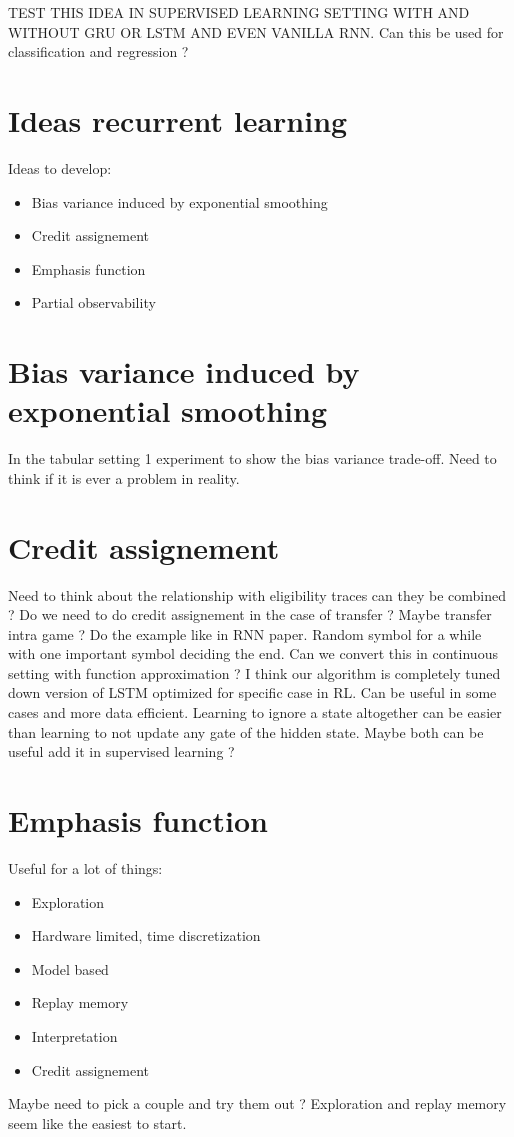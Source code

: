 \documentclass[11pt]{report}
\begin{document}
TEST THIS IDEA IN SUPERVISED LEARNING SETTING WITH AND WITHOUT GRU OR LSTM AND EVEN VANILLA RNN. Can this be used for classification and regression ? 

\section{Ideas recurrent learning}
Ideas to develop:
\begin{itemize}
	\item Bias variance induced by exponential smoothing
	\item Credit assignement
	\item Emphasis function
	\item Partial observability
\end{itemize}
\section{Bias variance induced by exponential smoothing}
In the tabular setting 1 experiment to show the bias variance trade-off. Need to think if it is ever a problem in reality.
\section{Credit assignement}
Need to think about the relationship with eligibility traces can they be combined ? 
Do we need to do credit assignement in the case of transfer ? Maybe transfer intra game ?
Do the example like in RNN paper. Random symbol for a while with one important symbol deciding the end. Can we convert this in continuous setting with function approximation ? I think our algorithm is completely tuned down version of LSTM optimized for specific case in RL. Can be useful in some cases and more data efficient. Learning to ignore a state altogether can be easier than learning to not update any gate of the hidden state. Maybe both can be useful add it in supervised learning ? 
\section{Emphasis function}
Useful for a lot of things:
\begin{itemize}
	\item Exploration
	\item Hardware limited, time discretization
	\item Model based
	\item Replay memory
	\item Interpretation
	\item Credit assignement
\end{itemize}
Maybe need to pick a couple and try them out ? Exploration and replay memory seem like the easiest to start.
\end{document}
